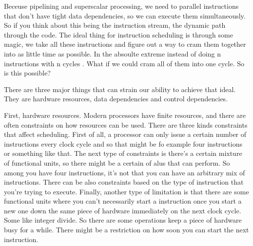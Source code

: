 Beceuse pipelining and superscalar processing, we need to parallel instructions that don't have 
tight data dependencies, so we can execute them simultaneously. So if you think about this 
being the instruction stream, the dynamic path through the code. The ideal thing for instruction scheduling
is through some magic, we take all these instructions and figure out a way to cram them together
into as little time as possible. In the absoulte extreme instead of doing n instructions with n cycles
. What if we could cram all of them into one cycle. So is this possible?

There are three major things that can strain our ability to achieve that ideal. They are 
hardware resources, data dependencies and control dependencies. 

First, hardware resources. Modern processors have finite resources, and there are often constraints
on how resources can be used. There are three kinds constraints that affect scheduling. First of all,
a processor can only issue a certain number of instructions every clock cycle and so that might 
be fo example four instructions or something like that. The next type of constraints is there's
a certain mixture of functional units, so there might be a certain of alus that can perform. So 
among you have four instructions, it's not that you can have an arbitrary mix of instructions.
There can be also constraints based on the type of instruction that you're trying to execute. Finally,
another type of limitation is that there are some functional units where you can't necessarily start a instruction
once you start a new one down the same piece of hardware immediately on the next clock cycle.
Some like integer divide. So there are some operations keep a piece of hardware busy for a while.
There might be a restriction on how soon you can start the next instruction.

